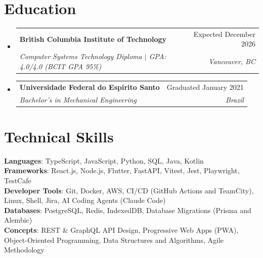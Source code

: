 \documentclass[letterpaper,11pt]{article}
\makeatletter
\newcommand{\resumeSubheading}[4]{
  \vspace{-2pt}\item
    \begin{tabular*}{0.97\textwidth}[t]{l@{\extracolsep{\fill}}r}
      \textbf{#1} & #2 \\
      \textit{\small#3} & \textit{\small #4} \\
    \end{tabular*}\vspace{-7pt}
}
\newcommand{\resumeSubHeadingListStart}{\begin{itemize}[leftmargin=0.15in, label={}]}
\newcommand{\resumeSubHeadingListEnd}{\end{itemize}}
\makeatother
\begin{document}
\section{Education}
  \resumeSubHeadingListStart
    \resumeSubheading
      {British Columbia Institute of Technology}{Expected December 2026}
      {Computer Systems Technology Diploma $|$ \textup{GPA: 4.0/4.0 (BCIT GPA 95\%)}}{Vancouver, BC}
    \resumeSubheading
      {Universidade Federal do Espirito Santo}{Graduated January 2021}
      {Bachelor's in Mechanical Engineering}{Brazil}
  \resumeSubHeadingListEnd

%
\section{Technical Skills}
 \begin{itemize}[leftmargin=0.15in, label={}]
    \small{\item{
     \textbf{Languages}{: TypeScript, JavaScript, Python, SQL, Java, Kotlin} \\
     \textbf{Frameworks}{: React.js, Node.js, Flutter, FastAPI, Vitest, Jest, Playwright, TestCafe} \\
     \textbf{Developer Tools}{: Git, Docker, AWS, CI/CD (GitHub Actions and TeamCity), Linux, Shell, Jira, AI Coding Agents (Claude Code)} \\
     \textbf{Databases}{: PostgreSQL, Redis, IndexedDB, Database Migrations (Prisma and Alembic)} \\
     \textbf{Concepts}{: REST \& GraphQL API Design, Progressive Web Apps (PWA), Object-Oriented Programming, Data Structures and Algorithms, Agile Methodology}
    }}
 \end{itemize}


\end{document}
